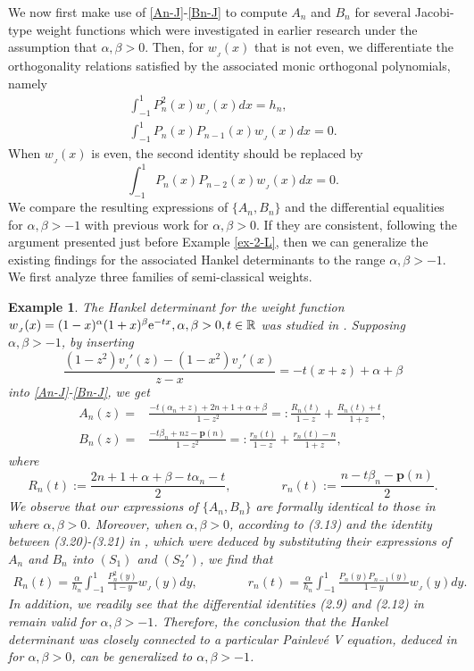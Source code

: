 \documentclass[12pt,a4paper]{article}    %
\newcommand{\e}{{\rm e}}
\newtheorem{exm}{Example}
\numberwithin{equation}{section}
\begin{document}
We now first make use of \eqref{An-J}-\eqref{Bn-J} to compute $A_n$ and $B_n$ for several Jacobi-type weight functions which were investigated in earlier research under the assumption that $\alpha,\beta>0$. Then, for $w_{_J}(x)$ that is not even, we differentiate the orthogonality relations satisfied by the associated monic orthogonal polynomials, namely
 \begin{gather*}	
 \int_{-1}^{1}P_n^2(x)w_{_J}(x)dx=h_n,\\
 \int_{-1}^{1}P_n(x)P_{n-1}(x)w_{_J}(x)dx=0.
\end{gather*}
When $w_{_J}(x)$ is even, the second identity should be replaced by
\[\int_{-1}^{1}P_n(x)P_{n-2}(x)w_{_J}(x)dx=0.\label{Pnn-2-J}\]
 We compare the resulting expressions of $\{A_n,B_n\}$ and the differential equalities for $\alpha,\beta>-1$ with previous work for $\alpha,\beta>0$. If they are consistent, following the argument presented just before Example \ref{ex-2-L}, then we can generalize the existing findings for the associated Hankel determinants to the range $\alpha,\beta>-1$. We first analyze three families of semi-classical weights.
 \\
\begin{exm}\label{ex-J2}
The Hankel determinant for the weight function $w_{_J}(x)=(1-x)^{\alpha}(1+x)^{\beta}\e^{-tx},\alpha,\beta>0, t\in\mathbb{R}$ was studied in \cite{BCE10}. Supposing $\alpha,\beta>-1$, by inserting
\[\frac{(1-z^2)v_{_J}'(z)-(1-x^2)v_{_J}'(x)}{z-x}=-t(x+z)+\alpha+\beta
\]
into \eqref{An-J}-\eqref{Bn-J}, we get
\begin{align*}
A_n(z)=&\frac{-t(\alpha_n+z)+2n+1+\alpha+\beta}{1-z^2}=:\frac{R_n(t)}{1-z}+\frac{R_n(t)+t}{1+z},\\ B_n(z)=&\frac{-t\beta_n+nz-\mathbf{p}(n)}{1-z^2}=:\frac{r_n(t)}{1-z}+\frac{r_n(t)-n}{1+z},
\end{align*}
where
\[
R_n(t):=\frac{2n+1+\alpha+\beta-t\alpha_n-t}{2},\qquad\qquad r_n(t):=\frac{n-t\beta_n-\mathbf{p}(n)}{2}.\]
We observe that our expressions of $\{A_n, B_n\}$ are formally identical to those in \cite{BCE10} where $\alpha,\beta>0$. Moreover, when $\alpha,\beta>0$, according to (3.13) and the identity between (3.20)-(3.21) in \cite{BCE10}, which were deduced by substituting their expressions of $A_n$ and $B_n$ into $(S_1)$ and $(S_2')$, we find that
\begin{align*}
R_n(t)=\frac{\alpha}{h_n}\int_{-1}^1\frac{P_n^2(y)}{1-y}w_{_J}(y)dy,\qquad\qquad r_n(t)=\frac{\alpha}{h_n}\int_{-1}^1\frac{P_n(y)P_{n-1}(y)}{1-y}w_{_J}(y)dy.
\end{align*}
In addition, we readily see that the differential identities (2.9) and (2.12) in \cite{BCE10} remain valid for $\alpha,\beta>-1$. Therefore, the conclusion that the Hankel determinant was closely connected to a particular Painlev\'{e} V equation, deduced in \cite{BCE10} for $\alpha,\beta>0$, can be generalized to $\alpha,\beta>-1$.
\end{exm}
\end{document}
